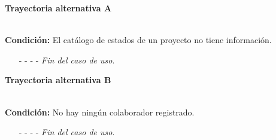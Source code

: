 \hypertarget{CU2-1:TAA}{\textbf{Trayectoria alternativa A}}\\
\noindent \textbf{Condición:} El catálogo de estados de un proyecto no tiene información.
\begin{enumerate}
	\UCpaso[\UCsist] Muestra el mensaje  en la pantalla  para indicar que no es posible realizar la operación debido a la falta de información necesaria para el sistema.
	\item[- -] - - {\em {Fin del caso de uso}}.%
\end{enumerate}

	\hypertarget{CU2-1:TAB}{\textbf{Trayectoria alternativa B}}\\
	\noindent \textbf{Condición:} No hay ningún colaborador registrado.
	\begin{enumerate}
		\UCpaso[\UCsist] Muestra el mensaje  en la pantalla  para indicar que no es posible realizar la operación debido a la falta de información necesaria para el sistema.
		\item[- -] - - {\em {Fin del caso de uso}}.%
	\end{enumerate}
	
